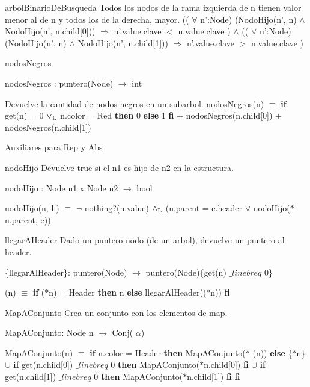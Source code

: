 \begin{DoxyParagraph}{arbol\-Binario\-De\-Busqueda}
\-Todos los nodos de la rama izquierda de n tienen valor menor al de n y todos los de la derecha, mayor. (( $\forall$ n'\-:\-Node) (\-Nodo\-Hijo(n', n) $\land$ \-Nodo\-Hijo(n', n.\-child\mbox{[}0\mbox{]})) $\Rightarrow$ n'.value.\-clave $<$ n.\-value.\-clave ) $\land$ (( $\forall$ n'\-:\-Node) (\-Nodo\-Hijo(n', n) $\land$ \-Nodo\-Hijo(n', n.\-child\mbox{[}1\mbox{]})) $\Rightarrow$ n'.value.\-clave $>$ n.\-value.\-clave ) 
\end{DoxyParagraph}
\begin{DoxyParagraph}{nodos\-Negros}

\end{DoxyParagraph}
nodos\-Negros \-: puntero(\-Node) $\to$ int\par
 \-Devuelve la cantidad de nodos negros en un subarbol. nodos\-Negros(n) $\equiv$ {\bfseries if} get(n) = 0 $\lor_{\rm L}$ n.\-color = \-Red {\bfseries then} 0 {\bfseries else} 1 {\bfseries fi} + nodos\-Negros(n.\-child\mbox{[}0\mbox{]}) + nodos\-Negros(n.\-child\mbox{[}1\mbox{]}) 

\-Auxiliares para \-Rep y \-Abs

\begin{DoxyParagraph}{nodo\-Hijo}
\-Devuelve true si el n1 es hijo de n2 en la estructura.
\end{DoxyParagraph}
nodo\-Hijo \-: \-Node n1 x \-Node n2 $\to$ bool\par
 nodo\-Hijo(n, h) $\equiv$ $\lnot$ nothing?(n.\-value) $\land_{\rm L}$ (n.\-parent = e.\-header $\lor$ nodo\-Hijo($\ast$n.parent, e)) 

\begin{DoxyParagraph}{llegar\-A\-Header}
\-Dado un puntero nodo (de un arbol), devuelve un puntero al header.
\end{DoxyParagraph}
\{llegar\-Al\-Header\}\-: puntero(\-Node) $\to$ puntero(\-Node)\{get(n) $\_linebr eq$ 0\}\par
 (n) $\equiv$ {\bfseries if} ($\ast$n) = \-Header {\bfseries then} n {\bfseries else} llegar\-Al\-Header(($\ast$n)) {\bfseries fi} 

\begin{DoxyParagraph}{\-Map\-A\-Conjunto}
\-Crea un conjunto con los elementos de map.\par

\end{DoxyParagraph}
\-Map\-A\-Conjunto\-: \-Node n $\to$ \-Conj( $\alpha$)\par
 \-Map\-A\-Conjunto(n) $\equiv$ {\bfseries if} n.\-color = \-Header {\bfseries then} \-Map\-A\-Conjunto($\ast$ (n)) {\bfseries else} \{$\ast$n\} $\cup$ {\bfseries if} get(n.\-child\mbox{[}0\mbox{]}) $\_linebr eq$ 0 {\bfseries then} \-Map\-A\-Conjunto($\ast$n.child\mbox{[}0\mbox{]}) {\bfseries fi} $\cup$ {\bfseries if} get(n.\-child\mbox{[}1\mbox{]}) $\_linebr eq$ 0 {\bfseries then} \-Map\-A\-Conjunto($\ast$n.child\mbox{[}1\mbox{]}) {\bfseries fi} {\bfseries fi} 

